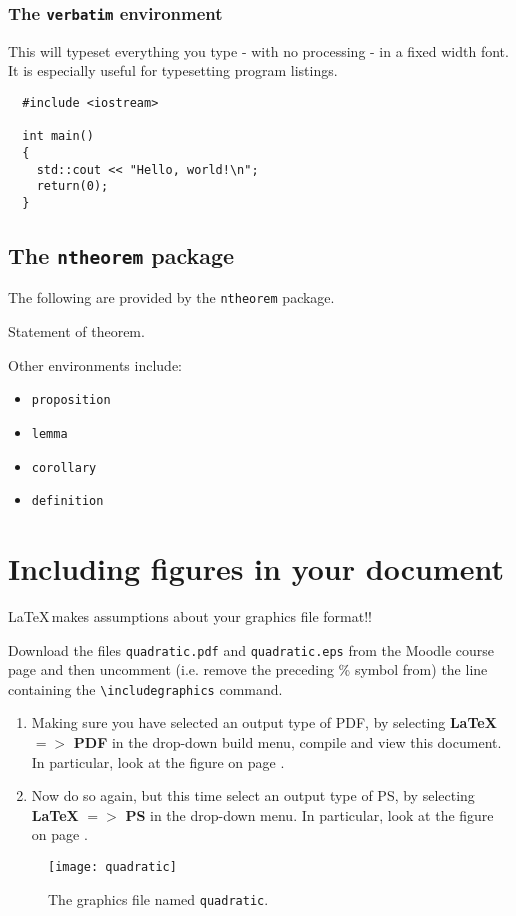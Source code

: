 \documentclass[a4paper,oneside]{book}
\begin{document}
\subsubsection{The \texttt{verbatim} environment}
This will typeset everything you type - with no processing - in a fixed width font.
It is especially useful for typesetting program listings.
\begin{verbatim}
  #include <iostream>

  int main()
  {
    std::cout << "Hello, world!\n";
    return(0);
  }
\end{verbatim}


\subsection{The \texttt{ntheorem} package}

The following are provided by the \texttt{ntheorem} package.

\begin{theorem}
Statement of theorem.
\end{theorem}

Other environments include:
\begin{itemize}
  \item \texttt{proposition}
  \item \texttt{lemma}
  \item \texttt{corollary}
  \item \texttt{definition}
\end{itemize}


\section{Including figures in your document}

\begin{center}
\LaTeX\,makes assumptions about your graphics file format!!
\end{center}

Download the files \texttt{quadratic.pdf} and \texttt{quadratic.eps} from the Moodle course page and then uncomment (i.e. remove the preceding \% symbol from) the line containing the \texttt{\textbackslash{includegraphics}} command.
\begin{enumerate}
\item
Making sure you have selected an output type of PDF, by selecting \textbf{LaTeX} $=>$ \textbf{PDF} in the drop-down build menu, compile and view this document.  In particular, look at the figure on page \pageref{fig_quadratic}.
\item
Now do so again, but this time select an output type of PS, by selecting \textbf{LaTeX} $=>$ \textbf{PS} in the drop-down menu. In particular, look at the figure on page \pageref{fig_quadratic}.
\end{enumerate}
\begin{figure}[h]
\label{fig_quadratic}
\begin{center}
\texttt{[image: quadratic]}
\caption{The graphics file named \texttt{quadratic}.}
\end{center}
\end{figure}
\end{document}
